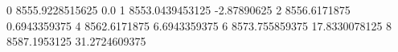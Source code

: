 0 8555.9228515625 0.0
1 8553.0439453125 -2.87890625
2 8556.6171875 0.6943359375
4 8562.6171875 6.6943359375
6 8573.755859375 17.8330078125
8 8587.1953125 31.2724609375
